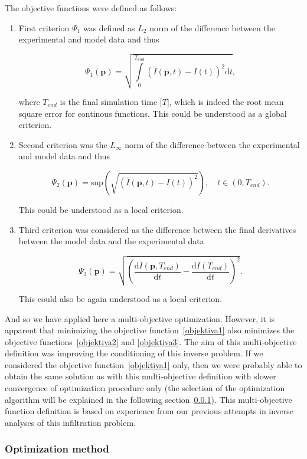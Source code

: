 \documentclass[review]{elsarticle}
\newenvironment{lineq}
    {\begin{linenomath*}
    \begin{equation}
    }
    { 
    \end{equation} 
    \end{linenomath*}
    }
\newcommand{\dd}{\mathrm{d}}
\renewcommand{\vec}{\mathbf}
\begin{document}
The objective functions were defined as follows:
\begin{enumerate}[label={\bf \Roman*}.]
\item First criterion $\Psi_1$ was defined as $L_2$ norm of the difference between the  experimental and model data and thus
\begin{lineq}
\label{objektiva1}
\Psi_1 (\vec{p}) = \sqrt{\int\limits_0^{T_{end}} \left( \bar{I}(\vec{p},t) - I(t) \right)^2 \dd t},
\end{lineq}
where $T_{end}$ is the final simulation time [$T$], which is indeed the root mean square error for continous functions. This could be understood as a global criterion.
\item Second criterion was the $L_{\infty}$ norm of the difference between the experimental and model data and thus
\begin{lineq}
\label{objektiva2}
\Psi_2 (\vec{p}) = \mathrm{sup} \left( \sqrt{\left( \bar{I}(\vec{p},t) - I(t) \right)^2} \right), \quad  t \in (0, T_{end}).
\end{lineq}
This could be understood as a local criterion.
\item Third criterion was considered as the difference between the final derivatives between the model data and the experimental data
\begin{lineq}
\label{objektiva3}
\Psi_3 (\vec{p}) =  \sqrt{\left( \frac{\dd \bar{I}(\vec{p},T_{end})}{\dd t} - \frac{\dd I(T_{end})}{\dd t} \right)^2}.
\end{lineq}
This could also be again understood as a local criterion.

\end{enumerate}
And so we have applied here a multi-objective optimization. However, it is apparent that minimizing the objective function~\eqref{objektiva1} also minimizes the objective functions~\eqref{objektiva2} and  \eqref{objektiva3}. The aim of this multi-objective definition was improving the conditioning of this inverse problem. If we considered the objective function~\eqref{objektiva1} only, then we were probably able to obtain the same solution as with this multi-objective definition with slower convergence of optimization procedure only (the selection of the optimization algorithm will be explained in the following section~\ref{optima}). This multi-objective function definition is based on experience from our previous attempts in inverse analyses of this infiltration problem.



\subsubsection{Optimization method}%
\label{optima}
\end{document}
